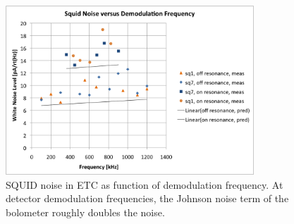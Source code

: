 \begin{figure}[ht!]
\begin{center}
\includegraphics[height=2.5in]{figures/squidnoise_temp}
\caption{\ac{SQUID} noise in \ac{ETC} as function of demodulation frequency. At detector demodulation frequencies, the Johnson noise term of the bolometer roughly doubles the noise.
\label{fig:dark_squid_noise} }
\end{center}
\end{figure}



